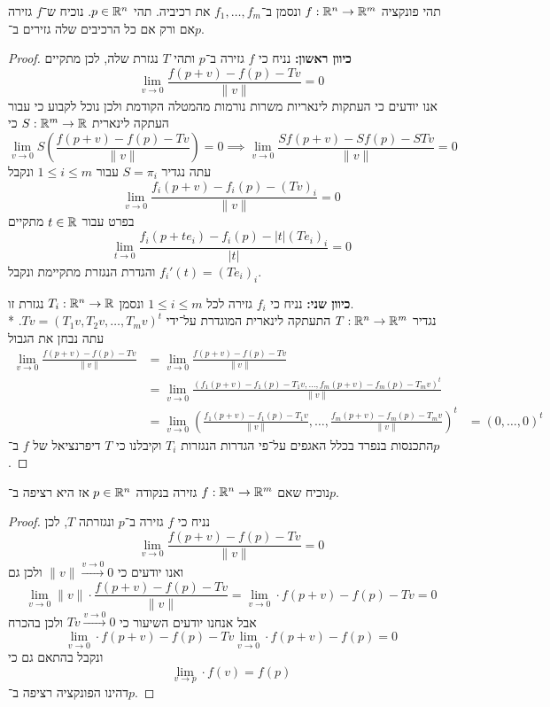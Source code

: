 \Question{}
תהי פונקציה $f : \mathbb{R}^n \to \mathbb{R}^m$ ונסמן ב־$f_1, \dots, f_m$ את רכיביה.
תהי $p \in \mathbb{R}^n$.
נוכיח ש־$f$ גזירה אם ורק אם כל הרכיבים שלה גזירים ב־$p$.
\begin{proof}
	\textbf{כיוון ראשון:}
	נניח כי $f$ גזירה ב־$p$ ותהי $T$ נגזרת שלה, לכן מתקיים
	\[
		\lim_{v \to 0} \frac{f(p + v) - f(p) - Tv}{\lVert v \rVert} = 0
	\]
	אנו יודעים כי העתקות לינאריות משרות נורמות מהמטלה הקודמת ולכן נוכל לקבוע כי עבור העתקה לינארית $S : \mathbb{R}^m \to \mathbb{R}$ כי
	\[
		\lim_{v \to 0} S(\frac{f(p + v) - f(p) - Tv}{\lVert v \rVert}) = 0
		\implies
		\lim_{v \to 0} \frac{S f(p + v) - S f(p) - STv}{\lVert v \rVert} = 0
	\]
	עתה נגדיר $S = \pi_i$ עבור $1 \le i \le m$ ונקבל
	\[
		\lim_{v \to 0} \frac{f_i(p + v) - f_i(p) - {(Tv)}_i}{\lVert v \rVert} = 0
	\]
	בפרט עבור $t \in \mathbb{R}$ מתקיים
	\[
		\lim_{t \to 0} \frac{f_i(p + te_i) - f_i(p) - |t| {(Te_i)}_i}{|t|} = 0
	\]
	והגדרת הנגזרת מתקיימת ונקבל $f_i'(t) = {(Te_i)}_i$.

	\textbf{כיוון שני:}
	נניח כי $f_i$ גזירה לכל $1 \le i \le m$ ונסמן $T_i : \mathbb{R}^n \to \mathbb{R}$ נגזרת זו. \\*
	נגדיר $T : \mathbb{R}^n \to \mathbb{R}^m$ התעתקה לינארית המוגדרת על־ידי $T v = {(T_1 v, T_2 v, \dots, T_m v)}^t$.
	עתה נבחן את הגבול
	\begin{align*}
		\lim_{v \to 0} \frac{f(p + v) - f(p) - Tv}{\lVert v \rVert}
		& = \lim_{v \to 0} \frac{f(p + v) - f(p) - Tv}{\lVert v \rVert} \\
		& = \lim_{v \to 0} \frac{{(f_1(p + v) - f_1(p) - T_1 v, \dots, f_m(p + v) - f_m(p) - T_m v)}^t}{\lVert v \rVert} \\
		& = \lim_{v \to 0} {\left( \frac{f_1(p + v) - f_1(p) - T_1 v}{\lVert v\rVert}, \dots, \frac{f_m(p + v) - f_m(p) - T_m v}{\lVert v\rVert}\right)}^t
		& = {(0, \dots, 0)}^t
	\end{align*}
	התכנסות בנפרד בכלל האגפים על־פי הגדרות הנגזרות $T_i$ וקיבלנו כי $T$ דיפרנציאל של $f$ ב־$p$.
\end{proof}

\Question{}
\Subquestion{}
נוכיח שאם $f : \mathbb{R}^n \to \mathbb{R}^m$ גזירה בנקודה $p \in \mathbb{R}^n$ אז היא רציפה ב־$p$.
\begin{proof}
	נניח כי $f$ גזירה ב־$p$ ונגזרתה $T$, לכן
	\[
		\lim_{v \to 0} \frac{f(p + v) - f(p) - Tv}{\lVert v \rVert} = 0
	\]
	ואנו יודעים כי $\lVert v \rVert \xrightarrow{v \to 0} 0$ ולכן גם
	\[
		\lim_{v \to 0} \lVert v \rVert \cdot \frac{f(p + v) - f(p) - Tv}{\lVert v \rVert}
		= \lim_{v \to 0} \cdot f(p + v) - f(p) - Tv
		= 0
	\]
	אבל אנחנו יודעים השיעור כי $Tv \xrightarrow{v \to 0} 0$ ולכן בהכרח
	\[
		\lim_{v \to 0} \cdot f(p + v) - f(p) - Tv
		\lim_{v \to 0} \cdot f(p + v) - f(p)
		= 0
	\]
	ונקבל בהתאם גם כי
	\[
		\lim_{v \to p} \cdot f(v) = f(p)
	\]
	דהינו הפונקציה רציפה ב־$p$.
\end{proof}

